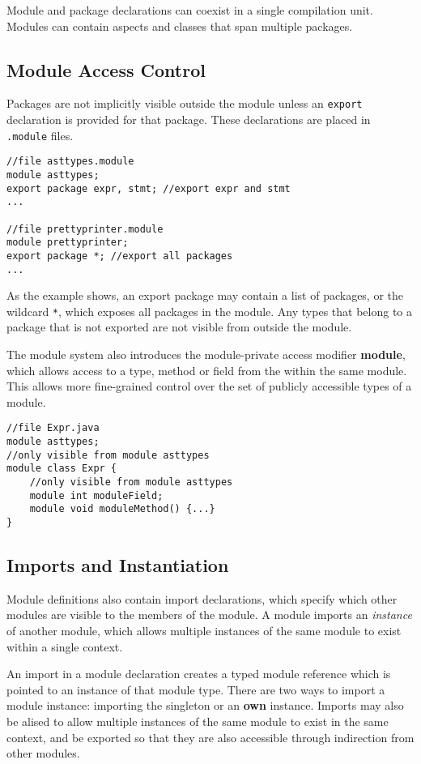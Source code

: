 Module and package declarations can coexist in a single compilation unit.
Modules can contain aspects and classes that span multiple packages.

\subsection{Module Access Control}

Packages are not implicitly visible outside the module unless an
\texttt{export} declaration is provided for that package. These declarations
are placed in \texttt{.module} files.

\begin{lstlisting}[caption={Export Package}]
//file asttypes.module
module asttypes;
export package expr, stmt; //export expr and stmt
...

//file prettyprinter.module
module prettyprinter;
export package *; //export all packages
...
\end{lstlisting}

As the example shows, an export package may contain a list of packages, or the
wildcard \texttt{*}, which exposes all packages in the module. Any types that
belong to a package that is not exported are not visible from outside the module.

The module system also introduces the module-private access modifier \textbf{module},
which allows access to a type, method or field from the within the same module. This
allows more fine-grained control over the set of publicly accessible types of a module.

\begin{lstlisting}
//file Expr.java
module asttypes;
//only visible from module asttypes
module class Expr {
	//only visible from module asttypes
	module int moduleField;
	module void moduleMethod() {...}
}
\end{lstlisting}

\subsection{Imports and Instantiation}

Module definitions also contain import declarations, which specify which
other modules are visible to the members of the module. A module imports 
an \textit{instance} of another module, which allows multiple instances
of the same module to exist within a single context.

An import in a module declaration creates a typed module reference which is pointed to
an instance of that module type. 
There are two ways to import a module instance: importing the singleton or
an \textbf{own} instance. Imports may also be alised to allow multiple instances
of the same module to exist in the same context, and be exported so that
they are also accessible through indirection from other modules.

